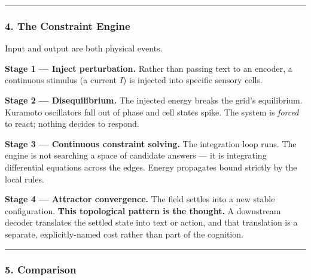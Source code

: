 \documentclass[
  11pt,
  a4paper,
]{article}
\begin{document}
\begin{center}\rule{0.5\linewidth}{0.5pt}\end{center}

\subsubsection{4. The Constraint Engine}\label{the-constraint-engine}

Input and output are both physical events.

\textbf{Stage 1 --- Inject perturbation.} Rather than passing text to an
encoder, a continuous stimulus (a current \(I\)) is injected into
specific sensory cells.

\textbf{Stage 2 --- Disequilibrium.} The injected energy breaks the
grid's equilibrium. Kuramoto oscillators fall out of phase and cell
states spike. The system is \emph{forced} to react; nothing decides to
respond.

\textbf{Stage 3 --- Continuous constraint solving.} The integration loop
runs. The engine is not searching a space of candidate answers --- it is
integrating differential equations across the edges. Energy propagates
bound strictly by the local rules.

\textbf{Stage 4 --- Attractor convergence.} The field settles into a new
stable configuration. \textbf{This topological pattern is the thought.}
A downstream decoder translates the settled state into text or action,
and that translation is a separate, explicitly-named cost rather than
part of the cognition.

\begin{center}\rule{0.5\linewidth}{0.5pt}\end{center}

\subsubsection{5. Comparison}\label{comparison}
\end{document}

